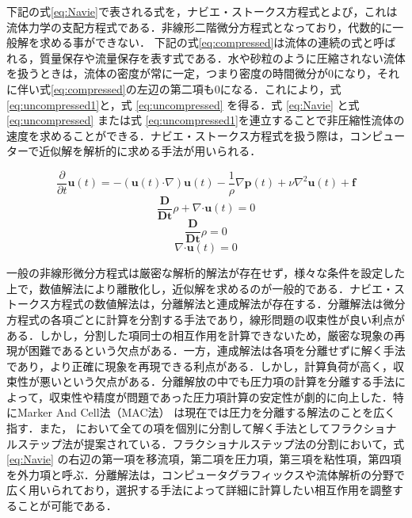 \documentclass[a4j,12pt]{jreport}
\begin{document}
	下記の式\ref{eq:Navie}で表される式を，ナビエ・ストークス方程式とよび，これは流体力学の支配方程式である．非線形二階微分方程式となっており，代数的に一般解を求める事ができない．
	下記の式\ref{eq:compressed}は流体の連続の式と呼ばれる，質量保存や流量保存を表す式である．水や砂粒のように圧縮されない流体を扱うときは，流体の密度が常に一定，つまり密度の時間微分が0になり，それに伴い式\ref{eq:compressed}の左辺の第二項も0になる．これにより，式\ref{eq:uncompressed1}と，式 \ref{eq:uncompressed} を得る．式 \ref{eq:Navie} と式\ref{eq:uncompressed} または式 \ref{eq:uncompressed1}を連立することで非圧縮性流体の速度を求めることができる．ナビエ・ストークス方程式を扱う際は，コンピューターで近似解を解析的に求める手法が用いられる．
	
	\begin{equation}\label{eq:Navie}
		\frac{\partial}{\partial t}\bm{u} (t)  = - (\bm{u} (t)  \boldsymbol{\cdot}\nabla) \bm{u} (t)   - \frac{1}{\rho}\nabla \bm{p} (t)  + \nu\nabla^2\bm{u} (t)  + \bm{f}
	\end{equation}
	\begin{equation}\label{eq:compressed}
		\frac{\mathbf{D}}{\mathbf{Dt}}\rho + \nabla\boldsymbol{\cdot}\bm{u} (t)  = 0
	\end{equation}
	\begin{equation}\label{eq:uncompressed1}
		\frac{\mathbf{D}}{\mathbf{Dt}}\rho  = 0
	\end{equation}
	\begin{equation}\label{eq:uncompressed}
		\nabla\boldsymbol{\cdot}\bm{u} (t)  = 0
	\end{equation}

一般の非線形微分方程式は厳密な解析的解法が存在せず，様々な条件を設定した上で，数値解法により離散化し，近似解を求めるのが一般的である．ナビエ・ストークス方程式の数値解法は，分離解法と連成解法が存在する．分離解法は微分方程式の各項ごとに計算を分割する手法であり，線形問題の収束性が良い利点がある．しかし，分割した項同士の相互作用を計算できないため，厳密な現象の再現が困難であるという欠点がある．一方，連成解法は各項を分離せずに解く手法であり，より正確に現象を再現できる利点がある．しかし，計算負荷が高く，収束性が悪いという欠点がある．分離解放の中でも圧力項の計算を分離する手法\cite{MAC,Chorin}によって，収束性や精度が問題であった圧力項計算の安定性が劇的に向上した．特にMarker And Cell法（MAC法） \cite{MAC}は現在では圧力を分離する解法のことを広く指す．また， \cite{MAC}において全ての項を個別に分割して解く手法としてフラクショナルステップ法が提案されている．フラクショナルステップ法の分割において，式 \ref{eq:Navie} の右辺の第一項を移流項，第二項を圧力項，第三項を粘性項，第四項を外力項と呼ぶ．分離解法は，コンピュータグラフィックスや流体解析の分野で広く用いられており，選択する手法によって詳細に計算したい相互作用を調整することが可能である．
\end{document}
